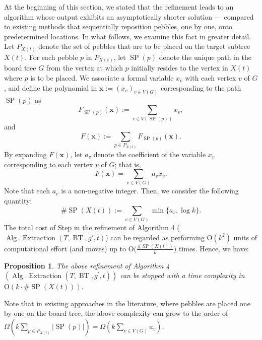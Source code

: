 \documentclass[letter,11pt]{article}
\newtheorem{prop}[thm]{Proposition}
\theoremstyle{definition}
\theoremstyle{definition}
\DeclareMathOperator{\BT}{BT}
\DeclareMathOperator{\Alg}{Alg}
\DeclareMathOperator{\Extraction}{Extraction}
\DeclareMathOperator{\SP}{SP}
\newcommand{\1}{\boldmath$~1~$\unboldmath}
\newcommand{\Ord}{\mathrm{O}}
\newcommand{\tume}{\hspace*{0.2em}}
\newcommand{\maru}[1]{{\ooalign{\hfill$\small#1$\hfill\crcr\scalebox{1.3}{$\bigcirc$}}}}
\begin{document}
At the beginning of this section, we stated that the refinement leads to an algorithm whose output exhibits an asymptotically shorter solution
--- compared to existing methods that sequentially reposition pebbles, one by one, onto predetermined locations.
In what follows, we examine this fact in greater detail.
Let $P_{X(t)}$ denote the set of pebbles that are to be placed on the target subtree $X(t)$.
For each pebble $p$ in $P_{X(t)}$, let $\SP(p)$ denote the unique path in the board tree $G$ from the vertex at which $p$ initially resides
to the vertex in $X(t)$ where $p$ is to be placed.
We associate a formal variable $x_v$ with each vertex $v$ of $G$, and define the polynomial in ${\mathbf x}:=(x_v)_{v\in V(G)}$ 
corresponding to the path $\SP(p)$ as
$$
F_{\SP(p)}({\mathbf x}) := \sum_{v \in V(\SP(p))} x_v,
$$
and 
$$
F({\mathbf x}) := \sum_{p \in P_{X(t)}} F_{\SP(p)}({\mathbf x}).
$$
By expanding $F({\mathbf x})$, let $a_v$ denote the coefficient of the variable $x_v$ corresponding to each vertex $v$ of $G$; that is,
$$
F({\mathbf x}) = \sum_{v \in V(G)} a_v x_v.
$$
Note that each $a_v$ is a non-negative integer. 
Then, we consider the following quantity:
$$
\#\SP(X(t)) := \sum_{v \in V(G)} \min\{a_v, \log k\}.
$$
The total cost of Step\tume\maru{5} in the refinement of Algorithm 4 ($\Alg.\Extraction(T, \BT, g', t)$) 
can be regarded as performing $\Ord(k^2)$ units of computational effort (and moves) up to $\Ord\big(\frac{\#\SP(X(t))}{k}\big)$ times.
Hence, we have:
\begin{prop}\label{refinement1-path-weight}
The above refinement of  Algorithm 4 $(\Alg.\Extraction(T, \BT,g^{\prime},t))$  can be stopped with a time complexity in $\Ord(k \cdot \#\SP(X(t)))$.
\end{prop}
Note that in existing approaches in the literature, where pebbles are placed one by one on the board tree,
the above complexity can grow to the order of $\Omega(k\sum_{p\in P_{X(t)}} |\SP(p)|)=\Omega(k \sum_{v \in V(G)} a_v)$.
\end{document}
